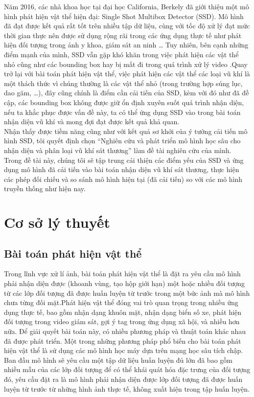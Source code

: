 \documentclass[a4paper]{article}
\begin{document}
Năm 2016, các nhà khoa học tại đại học California, Berkely \cite{ssd} đã giới thiệu một mô hình phát hiện vật thể hiện đại: Single Shot Multibox Detector (SSD). Mô hình đã đạt được kết quả rất tốt trên nhiều tập dữ liệu, cùng với tốc độ xử lý đạt mức thời gian thực nên được sử dụng rộng rãi trong các ứng dụng thực tế như phát hiện đối tượng trong ảnh y khoa, giám sát an ninh … Tuy nhiên, bên cạnh những điểm mạnh của mình, SSD vẫn gặp khó khăn trong việc phát hiện các vật thể nhỏ cũng như các bounding box hay bị mất đi trong quá trình xử lý video \cite{fpn, fpnssd}.Quay trở lại với bài toán phát hiện vật thể, việc phát hiện các vật thể các loại vũ khí là một thách thức vì chúng thường là các vật thể nhỏ (trong trường hợp súng lục, dao găm, …), đây cũng chính là điểm cần cải tiến của SSD, kèm với đó như đã đề cập, các bounding box không được giữ ổn định xuyên suốt quá trình nhận diện, nếu ta khắc phục được vấn đề này, ta có thể ứng dụng SSD vào trong bài toán nhận diện vũ khí và mong đợi đạt được kết quả khả quan. \\

Nhận thấy được tiềm năng cũng như với kết quả sơ khởi của ý tưởng cải tiến mô hình SSD, tôi quyết định chọn “Nghiên cứu và phát triển mô hình học sâu cho nhận diện và phân loại vũ khí sát thương” làm đề tài nghiên cứu của mình. Trong đề tài này, chúng tôi sẽ tập trung cải thiện các điểm yếu của SSD và ứng dụng mô hình đã cải tiến vào bài toán nhận diện vũ khí sát thương, thực hiện các phép đối chiếu và so sánh mô hình hiện tại (đã cải tiến) so với các mô hình truyền thống như hiện nay.


\section{\textbf{Cơ sở lý thuyết}}

\subsection{\textbf{Bài toán phát hiện vật thể}}
Trong lĩnh vực xử lí ảnh, bài toán phát hiện vật thể là đặt ra yêu cầu mô hình phải nhận diện được (khoanh vùng, tạo hộp giới hạn) một hoặc nhiều đối tượng từ các lớp đối tượng đã được huấn luyện từ trước trong một bức ảnh mà mô hình chưa từng đối mặt.Phát hiện vật thể đóng vai trò quan trọng trong nhiều ứng dụng thực tế, bao gồm nhận dạng khuôn mặt, nhận dạng biển số xe, phát hiện đối tượng trong video giám sát, gợi ý tag trong ứng dụng xã hội, và nhiều hơn nữa. Để giải quyết bài toán này, có nhiều phương pháp và thuật toán khác nhau đã được phát triển. Một trong những phương pháp phổ biến cho bài toán phát hiện vật thể là sử dụng các mô hình học máy dựa trên mạng học sâu tích chập. Ban đầu mô hình sẽ yêu cầu một tập dữ liệu huấn luyện đủ lớn đã bao gồm nhiều mẫu của các lớp đối tượng để có thể khái quát hóa đặc trưng của đối tượng đó, yêu cầu đặt ra là mô hình phải nhận diện được lớp đối tượng đã được huấn luyện từ trước từ những hình ảnh thực tế, không xuất hiện trong tập huấn luyện.
\end{document}
